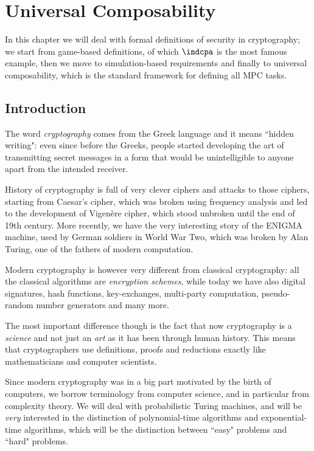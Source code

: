 \chapter{Universal Composability}\label{chapter_UC}

In this chapter we will deal with formal definitions of security in cryptography; we start from game-based definitions, of which $\indcpa$ is the most famous example, then we move to simulation-based requirements and finally to universal composability, which is the standard framework for defining all MPC tasks.

\section{Introduction}
The word \emph{cryptography} comes from the Greek language and it means ``hidden writing": even since before the Greeks, people started developing the art of transmitting secret messages in a form that would be unintelligible to anyone apart from the intended receiver.

History of cryptography is full of very clever ciphers and attacks to those ciphers, starting from Caesar's cipher, which was broken using frequency analysis and led to the development of Vigenère cipher, which stood unbroken until the end of 19th century. More recently, we have the very interesting story of the ENIGMA machine, used by German soldiers in World War Two, which was broken by Alan Turing, one of the fathers of modern computation.

Modern cryptography is however very different from classical cryptography: all the classical algorithms are \emph{encryption schemes}, while today we have also digital signatures, hash functions, key-exchanges, multi-party computation, pseudo-random number generators and many more.

The most important difference though is the fact that now cryptography is a \emph{science} and not just an \emph{art} as it has been through human history. This means that cryptographers use definitions, proofs and reductions exactly like mathematicians and computer scientists.

Since modern cryptography was in a big part motivated by the birth of computers, we borrow terminology from computer science, and in particular from complexity theory. We will deal with probabilistic Turing machines, and will be \emph{very} interested in the distinction of polynomial-time algorithms and exponential-time algorithms, which will be the distinction between ``easy" problems and ``hard" problems.

